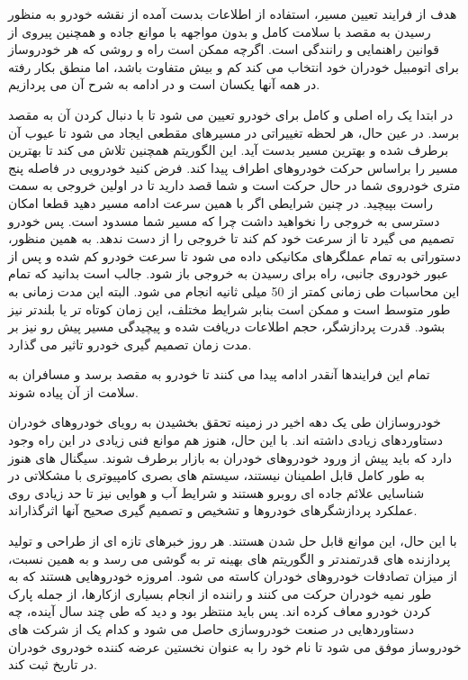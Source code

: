 هدف از فرایند تعیین مسیر، استفاده از اطلاعات بدست آمده از نقشه خودرو به منظور رسیدن به مقصد با سلامت کامل و بدون مواجهه با موانع جاده و همچنین پیروی از قوانین راهنمایی و رانندگی است. اگرچه ممکن است راه و روشی که هر خودروساز برای اتومبیل خودران خود انتخاب می کند کم و بیش متفاوت باشد، اما منطق بکار رفته در همه آنها یکسان است و در ادامه به شرح آن می پردازیم.

در ابتدا یک راه اصلی و کامل برای خودرو تعیین می شود تا با دنبال کردن آن به مقصد برسد. در عین حال، هر لحظه تغییراتی در مسیرهای مقطعی ایجاد می شود تا عیوب آن برطرف شده و بهترین مسیر بدست آید. این الگوریتم همچنین تلاش می کند تا بهترین مسیر را براساس حرکت خودروهای اطراف پیدا کند. فرض کنید خودرویی در فاصله پنج متری خودروی شما در حال حرکت است و شما قصد دارید تا در اولین خروجی به سمت راست بپیچید. در چنین شرایطی اگر با همین سرعت ادامه مسیر دهید قطعا امکان دسترسی به خروجی را نخواهید داشت چرا که مسیر شما مسدود است. پس خودرو تصمیم می گیرد تا از سرعت خود کم کند تا خروجی را از دست ندهد. به همین منظور، دستوراتی به تمام عملگرهای مکانیکی داده می شود تا سرعت خودرو کم شده و پس از عبور خودروی جانبی، راه برای رسیدن به خروجی باز شود. جالب است بدانید که تمام این محاسبات طی زمانی کمتر از 50 میلی ثانیه انجام می شود. البته این مدت زمانی به طور متوسط است و ممکن است بنابر شرایط مختلف، این زمان کوتاه تر یا بلندتر نیز بشود. قدرت پردازشگر، حجم اطلاعات دریافت شده و پیچیدگی مسیر پیش رو نیز بر مدت زمان تصمیم گیری خودرو تاثیر می گذارد.

تمام این فرایندها آنقدر ادامه پیدا می کنند تا خودرو به مقصد برسد و مسافران به سلامت از آن پیاده شوند.

خودروسازان طی یک دهه اخیر در زمینه تحقق بخشیدن به رویای خودروهای خودران دستاوردهای زیادی داشته اند. با این حال، هنوز هم موانع فنی زیادی در این راه وجود دارد که باید پیش از ورود خودروهای خودران به بازار برطرف شوند. سیگنال های  هنوز به طور کامل قابل اطمینان نیستند، سیستم های بصری کامپیوتری با مشکلاتی در شناسایی علائم جاده ای روبرو هستند و شرایط آب و هوایی نیز تا حد زیادی روی عملکرد پردازشگرهای خودروها و تشخیص و تصمیم گیری صحیح آنها اثرگذاراند.

با این حال، این موانع قابل حل شدن هستند. هر روز خبرهای تازه ای از طراحی و تولید پردازنده های قدرتمندتر و الگوریتم های بهینه تر به گوشی می رسد و به همین نسبت، از میزان تصادفات خودروهای خودران کاسته می شود. امروزه خودروهایی هستند که به طور نمیه خودران حرکت می کنند و راننده از انجام بسیاری ازکارها، از جمله پارک کردن خودرو معاف کرده اند. پس باید منتظر بود و دید که طی چند سال آینده، چه دستاوردهایی در صنعت خودروسازی حاصل می شود و کدام یک از شرکت های خودروساز موفق می شود تا نام خود را به عنوان نخستین عرضه کننده خودروی خودران در تاریخ ثبت کند.


